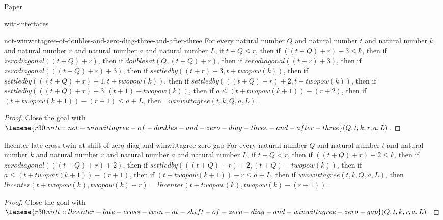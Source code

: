 \begin{lexlean}{Paper}
\begin{section}{witt-interfaces}
  \begin{theorem}{not-winwittagree-of-doubles-and-zero-diag-three-and-after-three}
  For every natural number \(Q\) and natural number \(t\) and natural number \(k\) and natural number \(r\) and natural number \(a\) and natural number \(L\), if \(t + Q ≤ r\), then if \(((t + Q) + r) + 3 ≤ k\), then if \(zerodiagonal((t + Q) + r)\), then if \(doublesat(Q, (t + Q) + r)\), then if \(zerodiagonal((t + r) + 3)\), then if \(zerodiagonal(((t + Q) + r) + 3)\), then if \(settledby((t + r) + 3, t + twopow(k))\), then if \(settledby(((t + Q) + r) + 1, t + twopow(k))\), then if \(settledby(((t + Q) + r) + 2, t + twopow(k))\), then if \(settledby(((t + Q) + r) + 3, (t + 1) + twopow(k))\), then if \(a ≤ (t + twopow(k + 1)) - (r + 2)\), then if \((t + twopow(k + 1)) - (r + 1) ≤ a + L\), then \(¬ winwittagree(t, k, Q, a, L)\).
  \begin{proof}
  Close the goal with \(\lexeme{r30.witt::not-winwittagree-of-doubles-and-zero-diag-three-and-after-three}(Q, t, k, r, a, L)\).
  \end{proof}
  \end{theorem}

  \begin{theorem}{lhcenter-late-cross-twin-at-shift-of-zero-diag-and-winwittagree-zero-gap}
  For every natural number \(Q\) and natural number \(t\) and natural number \(k\) and natural number \(r\) and natural number \(a\) and natural number \(L\), if \(t + Q < r\), then if \(((t + Q) + r) + 2 ≤ k\), then if \(zerodiagonal(((t + Q) + r) + 2)\), then if \(settledby(((t + Q) + r) + 2, (t + Q) + twopow(k))\), then if \(a ≤ (t + twopow(k + 1)) - (r + 1)\), then if \((t + twopow(k + 1)) - r ≤ a + L\), then if \(winwittagree(t, k, Q, a, L)\), then \(lhcenter(t + twopow(k), twopow(k) - r) = lhcenter(t + twopow(k), twopow(k) - (r + 1))\).
  \begin{proof}
  Close the goal with \(\lexeme{r30.witt::lhcenter-late-cross-twin-at-shift-of-zero-diag-and-winwittagree-zero-gap}(Q, t, k, r, a, L)\).
  \end{proof}
  \end{theorem}


\end{section}
\end{lexlean}
